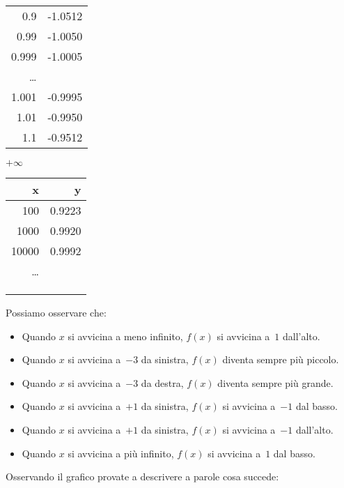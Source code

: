 \begin{esempio}
\begin{minipage}{.24\textwidth}
\begin{center}
\begin{tabular}{r|r}
0.9 & -1.0512\\
0.99 & -1.0050 \\
0.999 & -1.0005 \\
\dots \\
1.001 & -0.9995 \\
1.01 & -0.9950 \\
1.1 & -0.9512 \\
\end{tabular}
\end{center}
\end{minipage}
\begin{minipage}{.24\textwidth}
\begin{center}
\(+\infty\)\\
\begin{tabular}{r|r}
x & y\\\hline
100 & 0.9223 \\
1000 & 0.9920 \\
10000 & 0.9992 \\
\dots \\
&\\
&\\
&
\end{tabular}
\end{center}
\end{minipage}
Possiamo osservare che:
\begin{itemize} [nosep]
 \item 
Quando \(x\) si avvicina a meno infinito, \(f(x)\) si avvicina a~\(1\) dall'alto.
 \item 
Quando \(x\) si avvicina a~\(-3\) da sinistra, \(f(x)\) diventa sempre più 
piccolo.
 \item 
Quando \(x\) si avvicina a~\(-3\) da destra, \(f(x)\) diventa sempre più 
grande.
 \item 
Quando \(x\) si avvicina a~\(+1\) da sinistra, \(f(x)\)  si avvicina a~\(-1\) dal 
basso.
 \item 
Quando \(x\) si avvicina a~\(+1\) da sinistra, \(f(x)\)  si avvicina a~\(-1\) 
dall'alto.
 \item 
Quando \(x\) si avvicina a più infinito, \(f(x)\) si avvicina a~\(1\) dal basso.
\end{itemize}
\begin{center}\scalebox{.6}{\limitigraficoa}\end{center}
\end{esempio}

Osservando il grafico provate a descrivere a parole cosa succede:

